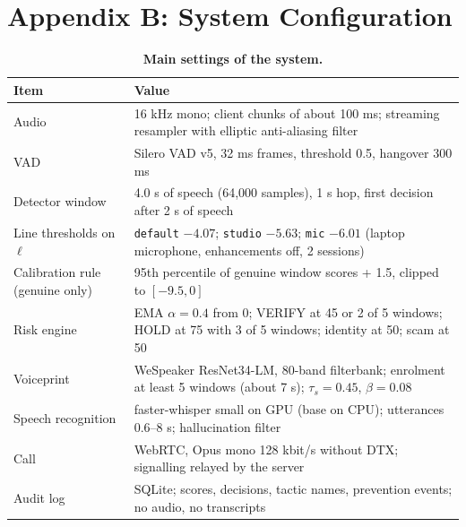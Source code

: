 \documentclass[10pt,a4paper,twocolumn]{article}
\newcommand{\llr}{\ell}
\begin{document}
\section{Appendix B: System Configuration}
\begin{table}[H]
\centering\small
\caption{\textbf{Main settings of the system.}}
\label{tab:config}
\begin{tabular}{@{}p{}p{}@{}}
\toprule
\textbf{Item} & \textbf{Value}\\
\midrule
Audio & 16 kHz mono; client chunks of about 100 ms; streaming resampler with elliptic anti-aliasing filter\\
VAD & Silero VAD v5, 32 ms frames, threshold 0.5, hangover 300 ms\\
Detector window & 4.0 s of speech (64,000 samples), 1 s hop, first decision after 2 s of speech\\
Line thresholds on $\llr$ & \texttt{default} $-4.07$; \texttt{studio} $-5.63$; \texttt{mic} $-6.01$ (laptop microphone, enhancements off, 2 sessions)\\
Calibration rule (genuine only) & 95th percentile of genuine window scores + 1.5, clipped to $[-9.5, 0]$\\
Risk engine & EMA $\alpha=0.4$ from 0; VERIFY at 45 or 2 of 5 windows; HOLD at 75 with 3 of 5 windows; identity at 50; scam at 50\\
Voiceprint & WeSpeaker ResNet34-LM, 80-band filterbank; enrolment at least 5 windows (about 7 s); $\tau_s=0.45$, $\beta=0.08$\\
Speech recognition & faster-whisper small on GPU (base on CPU); utterances 0.6--8 s; hallucination filter\\
Call & WebRTC, Opus mono 128 kbit/s without DTX; signalling relayed by the server\\
Audit log & SQLite; scores, decisions, tactic names, prevention events; no audio, no transcripts\\
\bottomrule
\end{tabular}
\end{table}
\end{document}
